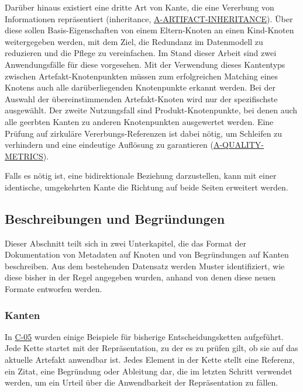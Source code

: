 Darüber hinaus existiert eine dritte Art von Kante, die eine Vererbung von Informationen repräsentiert (inheritance, \hyperref[subsec:req-selektor-inheritance]{A-ARTIFACT-INHERITANCE}).
Über diese sollen Basis-Eigenschaften von einem Eltern-Knoten an einen Kind-Knoten weitergegeben werden, mit dem Ziel, die Redundanz im Datenmodell zu reduzieren und die Pflege zu vereinfachen.
Im Stand dieser Arbeit sind zwei Anwendungsfälle für diese vorgesehen.
Mit der Verwendung dieses Kantentyps zwischen Artefakt-Knotenpunkten müssen zum erfolgreichen Matching eines Knotens auch alle darüberliegenden Knotenpunkte erkannt werden.
Bei der Auswahl der übereinstimmenden Artefakt-Knoten wird nur der spezifischste ausgewählt.
Der zweite Nutzungsfall sind Produkt-Knotenpunkte, bei denen auch alle geerbten Kanten zu anderen Knotenpunkten ausgewertet werden.
Eine Prüfung auf zirkuläre Vererbungs-Referenzen ist dabei nötig, um Schleifen zu verhindern und eine eindeutige Auflösung zu garantieren (\hyperref[subsec:req-graph-inner-consistency]{A-QUALITY-METRICS}).

Falls es nötig ist, eine bidirektionale Beziehung darzustellen, kann mit einer identische, umgekehrten Kante die Richtung auf beide Seiten erweitert werden.

\subsection{Beschreibungen und Begründungen}\label{subsec:model-rationale}

Dieser Abschnitt teilt sich in zwei Unterkapitel, die das Format der Dokumentation von Metadaten auf Knoten und von Begründungen auf Kanten beschreiben.
Aus dem bestehenden Datensatz werden Muster identifiziert, wie diese bisher in der Regel angegeben wurden, anhand von denen diese neuen Formate entworfen werden.

\subsubsection{Kanten}

In \hyperref[subsec:c-05-reason-not-good-enough]{C-05} wurden einige Beispiele für bisherige Entscheidungsketten aufgeführt.
Jede Kette startet mit der Repräsentation, zu der es zu prüfen gilt, ob sie auf das aktuelle Artefakt anwendbar ist.
Jedes Element in der Kette stellt eine Referenz, ein Zitat, eine Begründung oder Ableitung dar, die im letzten Schritt verwendet werden, um ein Urteil über die Anwendbarkeit der Repräsentation zu fällen.

